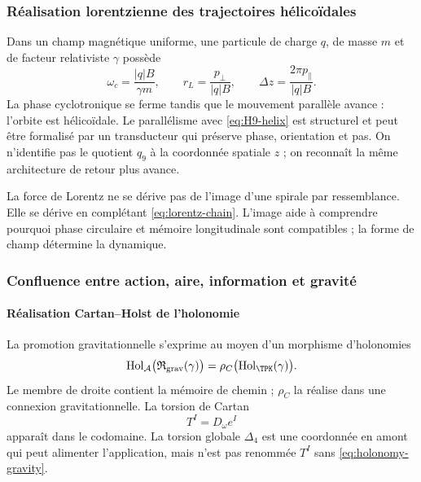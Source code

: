 \subsubsection{Réalisation lorentzienne des trajectoires hélicoïdales}

Dans un champ magnétique uniforme, une particule de charge \(q\), de masse \(m\) et de
facteur relativiste \(\gamma\) possède
\begin{equation}
\omega_c=\frac{|q|B}{\gamma m},
\qquad
r_L=\frac{p_\perp}{|q|B},
\qquad
\Delta z=\frac{2\pi p_\parallel}{|q|B}.
\label{eq:lorentz-helix}
\end{equation}
La phase cyclotronique se ferme tandis que le mouvement parallèle avance : l'orbite
est hélicoïdale. Le parallélisme avec \eqref{eq:H9-helix} est structurel et peut
être formalisé par un transducteur qui préserve phase, orientation et pas. On
n'identifie pas le quotient \(q_9\) à la coordonnée spatiale \(z\) ; on reconnaît
la même architecture de retour plus avance.

La force de Lorentz ne se dérive pas de l'image d'une spirale par ressemblance.
Elle se dérive en complétant \eqref{eq:lorentz-chain}. L'image aide à comprendre
pourquoi phase circulaire et mémoire longitudinale sont compatibles ; la forme de
champ détermine la dynamique.

\subsubsection{Confluence entre action, aire, information et gravité}

\paragraph{Réalisation Cartan--Holst de l'holonomie}

La promotion gravitationnelle s'exprime au moyen d'un morphisme d'holonomies
\begin{equation}
\operatorname{Hol}_{\mathcal A}
\bigl(\mathfrak R_{\mathrm{grav}}(\gamma)\bigr)
=\rho_C\bigl(\operatorname{Hol}_{\TPK}(\gamma)\bigr).
\label{eq:holonomy-gravity}
\end{equation}
Le membre de droite contient la mémoire de chemin ; \(\rho_C\) la réalise dans une
connexion gravitationnelle. La torsion de Cartan
\[
T^I=D_\omega e^I
\]
apparaît dans le codomaine. La torsion globale \(\Delta_4\) est une coordonnée
en amont qui peut alimenter l'application, mais n'est pas renommée \(T^I\) sans
\eqref{eq:holonomy-gravity}.

